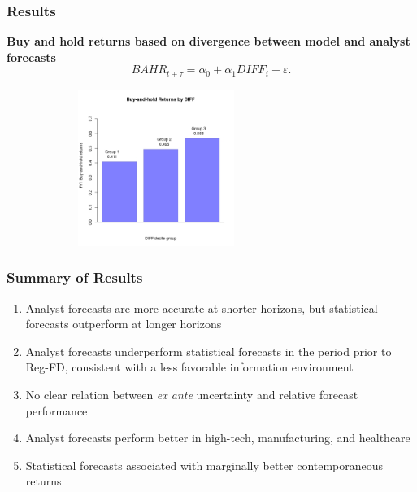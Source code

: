\documentclass{beamer}
\begin{document}
\begin{frame}
\frametitle{Results}
\textbf{Buy and hold returns based on divergence between model and analyst forecasts}
\begin{equation*}
BAHR_{t+\tau} = \alpha_{0} + \alpha_{1}DIFF_{i} + \varepsilon.
\end{equation*}
\begin{center}
 \begin{figure}
    \includegraphics[height=2in, width=3in]{bahr-diff-decile2.jpeg}
\end{figure}
\end{center}
\end{frame}


\begin{frame}
\frametitle{Summary of Results}
\begin{enumerate}
\item Analyst forecasts are more accurate at shorter horizons, but statistical forecasts outperform at longer horizons
\item Analyst forecasts underperform statistical forecasts in the period prior to Reg-FD, consistent with a less favorable information environment
\item No clear relation between \emph{ex ante} uncertainty and relative forecast performance
\item Analyst forecasts perform better in high-tech, manufacturing, and healthcare
\item Statistical forecasts associated with marginally better contemporaneous returns
\end{enumerate}
\end{frame}
\end{document}
